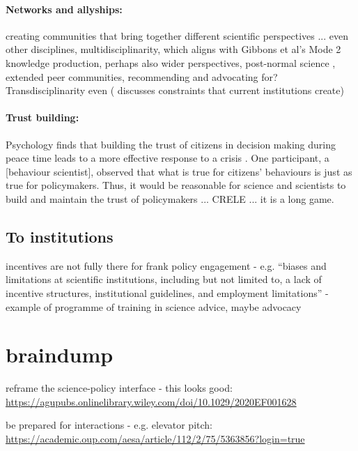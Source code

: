\paragraph{Networks and allyships:}

creating communities that bring together different scientific perspectives ... even other disciplines, multidisciplinarity, which aligns with Gibbons et al's Mode 2 knowledge production, perhaps also wider perspectives, post-normal science \cite{FuntowiczR1993}, extended peer communities, \cite{Jasanoff2003} recommending and advocating for? Transdisciplinarity even (\textcite{RussellWC2008} discusses constraints that current institutions create)

\paragraph{Trust building:}

Psychology finds that building the trust of citizens in decision making during peace time leads to a more effective response to a crisis \cite{BollykyP2024}. One participant, a [behaviour scientist], observed that what is true for citizens' behaviours is just as true for policymakers. Thus, it would be reasonable for science and scientists to build and maintain the trust of policymakers ... CRELE ... it is a long game.



\subsection{To institutions}
incentives are not fully there for frank policy engagement - e.g. \cite{ElsensohnACDGGKPRS2019} ``biases and limitations at scientific institutions, including but not limited to, a lack of incentive structures, institutional guidelines, and employment limitations'' - example of programme of training in science advice, maybe advocacy \cite{RussellWC2008}


\section{braindump}

reframe the science-policy interface - this looks good: \url{https://agupubs.onlinelibrary.wiley.com/doi/10.1029/2020EF001628}

be prepared for interactions - e.g. elevator pitch: \url{https://academic.oup.com/aesa/article/112/2/75/5363856?login=true}

